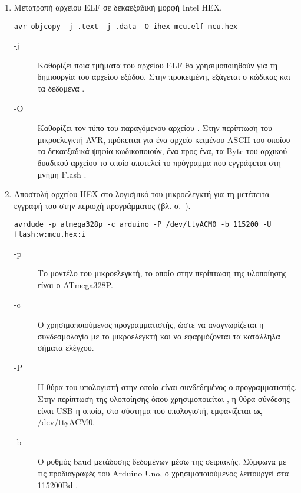 \begin{enumerate}
    \item Μετατροπή αρχείου ELF σε δεκαεξαδική μορφή Intel HEX.
\begin{lstlisting}
avr-objcopy -j .text -j .data -O ihex mcu.elf mcu.hex
\end{lstlisting}

    \begin{description}
        \item[-j] Καθορίζει ποια τμήματα του αρχείου ELF θα χρησιμοποιηθούν για
        τη δημιουργία του αρχείου εξόδου. Στην προκειμένη, εξάγεται ο κώδικας
        και τα δεδομένα \parencite[346]{avrlibc}.

        \item[-O] Καθορίζει τον τύπο του παραγόμενου αρχείου
        \parencite[346]{avrlibc}. Στην περίπτωση του μικροελεγκτή AVR, πρόκειται
        για ένα αρχείο κειμένου ASCII του οποίου τα δεκαεξαδικά ψηφία
        κωδικοποιούν, ένα προς ένα, τα Byte του αρχικού δυαδικού αρχείου το
        οποίο αποτελεί το πρόγραμμα που εγγράφεται στη μνήμη Flash
        \parencites[4]{intel88}[10]{atmel12programmer}.
    \end{description}


    \item Αποστολή αρχείου HEX στο λογισμικό  του μικροελεγκτή
    για τη μετέπειτα εγγραφή του στην περιοχή προγράμματος (βλ.
     σ.~\pageref{subsec:avr:progmem}).
\begin{lstlisting}
avrdude -p atmega328p -c arduino -P /dev/ttyACM0 -b 115200 -U flash:w:mcu.hex:i
\end{lstlisting}
    \begin{description}
        \item[-p] Το μοντέλο του μικροελεγκτή, το οποίο στην περίπτωση της
        υλοποίησης είναι ο ATmega328P.

        \item[-c] Ο χρησιμοποιούμενος προγραμματιστής, ώστε να αναγνωρίζεται η
        συνδεσμολογία με το μικροελεγκτή και να εφαρμόζονται τα κατάλληλα
        σήματα ελέγχου.

        \item[-P] Η θύρα του υπολογιστή στην οποία είναι συνδεδεμένος ο
        προγραμματιστής. Στην περίπτωση της υλοποίησης όπου χρησιμοποιείται
        , η θύρα σύνδεσης είναι USB η οποία, στο σύστημα του
        υπολογιστή, εμφανίζεται ως \slash{}dev\slash{}ttyACM0.

        \item[-b] Ο ρυθμός baud μετάδοσης δεδομένων μέσω της σειριακής. Σύμφωνα
        με τις προδιαγραφές του Arduino Uno, ο χρησιμοποιούμενος  λειτουργεί στα 115200Bd \parencite{arduino:environ}.


\end{description}
\end{enumerate}
